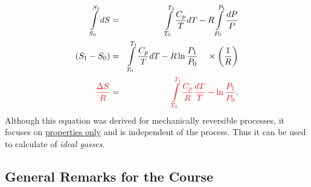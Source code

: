 \documentclass[12pts,a4paper,amsmath,amssymb,floatfix]{article}%
\newcommand{\frc}{\displaystyle\frac}
\newcommand{\red}{\textcolor{red}}
\begin{document}
\begin{enumerate}[i)]
\begin{eqnarray}
                    \int\limits_{S_{0}}^{S_{1}} dS &=& \int\limits_{T_{0}}^{T_{1}} \frc{C_{p}}{T}dT - R\int\limits_{P_{0}}^{P_{1}}\frc{dP}{P} \nonumber \\
                    \left(S_{1}-S_{0}\right) &=& \int\limits_{T_{0}}^{T_{1}} \frc{C_{p}}{T}dT - R\ln{\frc{P_{1}}{P_{0}}} \;\;\;\;\times\left(\frc{1}{R}\right) \nonumber \\
                    \red{\frc{\Delta S}{R}} &=& \red{\int\limits_{T_{0}}^{T_{1}} \frc{C_{p}}{R}\frc{dT}{T} - \ln{\frc{P_{1}}{P_{0}}} }.
                \end{eqnarray}
           Although this equation was derived for mechanically reversible processes, it focuses on \underline{properties only} and is independent of the process. Thus it can be used to calculate of {\it ideal gasses}.

               
%
   \end{enumerate}

\subsection{General Remarks for the Course}
\end{document}
